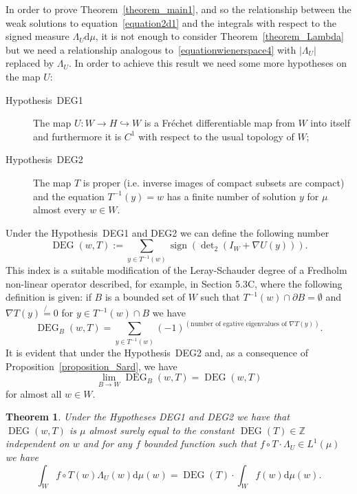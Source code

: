 \documentclass[a4paper,10pt]{article}
\newcommand{\assign}{:=}
\newcommand{\mathd}{\mathrm{d}}
\newcommand{\tmop}[1]{\ensuremath{\operatorname{#1}}}
\newtheorem{theorem}{Theorem}
\begin{document}
In order to prove Theorem~\ref{theorem_main1}, and so the relationship between
the weak solutions to equation~{\eqref{equation2d1}} and the integrals with
respect to the signed measure $\Lambda_U \mathd \mu$, it is not enough to
consider Theorem~\ref{theorem_Lambda} but we need a relationship analogous
to~{\eqref{equationwienerspace4}} with $| \Lambda_U |$ replaced by
$\Lambda_U$. In order to achieve this result we need some more hypotheses on
the map $U$:
\begin{description}
  \item[Hypothesis~DEG1] The map $U : W \rightarrow H \hookrightarrow W$ is a
  Fr{\'e}chet differentiable map from $W$ into itself and furthermore it is
  $C^1$ with respect to the usual topology of $W$;
  
  \item[Hypothesis~DEG2] The map $T$ is proper (i.e. inverse images of compact
  subsets are compact) and the equation $T^{- 1} (y) = w$ has a finite number
  of solution $y$ for $\mu$ almost every $w \in W$. 
\end{description}
Under the Hypothesis~DEG1 and DEG2 we can define the following number
\[ \tmop{DEG} (w, T) \assign \sum_{y \in T^{- 1} (w)} \tmop{sign} (\det\nolimits_2 (I_W
   + \nabla U (y))) . \]
This index is a suitable modification of the Leray-Schauder degree of a
Fredholm non-linear operator described, for example, in {\cite{Berger1977}}
Section 5.3C, where the following definition is given: if $B$ is a bounded set
of $W$ such that $T^{- 1} (w) \cap \partial B = \emptyset$ and $\nabla T (y)
\not{=} 0$ for $y \in T^{- 1} (w) \cap B$ we have
\[ \tmop{DEG}_B (w, T) = \sum_{y \in T^{- 1} (w)} (- 1)^{\left( \text{number
   of egative eigenvalues of $\nabla T (y)$} \right)} . \]
It is evident that under the Hypothesis~DEG2 and, as a consequence of
Proposition~\ref{proposition_Sard}, we have
\[ \lim_{B \rightarrow W} \tmop{DEG}_B (w, T) = \tmop{DEG} (w, T) \]
for almost all $w \in W$.

\begin{theorem}
  \label{theorem_wienerspace3}Under the Hypotheses DEG1 and DEG2 we have that
  $\tmop{DEG} (w, T)$ is $\mu$ almost surely equal to the constant $\tmop{DEG}
  (T) \in \mathbb{Z}$ independent on $w$ and for any $f$ bounded function such
  that $f \circ T \cdot \Lambda_U \in L^1 (\mu)$ we have
  \[ \int_W f \circ T (w) \Lambda_U (w) \mathd \mu (w) = \tmop{DEG} (T) \cdot
     \int_W f (w) \mathd \mu (w) . \]
\end{theorem}
\end{document}
